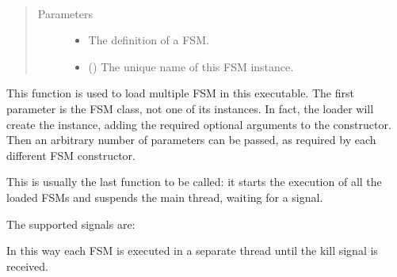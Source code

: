 \documentclass[letterpaper,10pt,english]{sphinxmanual}
\begin{document}

\begin{fulllineitems}
\label{\detokenize{loader:loader.loader.load}}~\begin{quote}\begin{description}
\item[{Parameters}] \leavevmode\begin{itemize}
\item {} 
 \textendash{} The definition of a FSM.

\item {} 
 () \textendash{} The unique name of this FSM instance.

\end{itemize}

\end{description}\end{quote}

This function is used to load multiple FSM in this executable. The first
parameter is the FSM class, not one of its instances. In fact, the loader
will create the instance, adding the required optional arguments to the
constructor. Then an arbitrary number of parameters can be passed, as
required by each different FSM constructor.

\end{fulllineitems}


\begin{fulllineitems}
\label{\detokenize{loader:loader.loader.start}}
This is usually the last function to be called: it starts the execution of
all the loaded FSMs and suspends the main thread, waiting for a signal.

The supported signals are:

%
\begin{sphinxVerbatim}[commandchars=\\\{\}]
         
         
\end{sphinxVerbatim}

In this way each FSM is executed in a separate thread until the kill signal
is received.

\end{fulllineitems}
\end{document}
